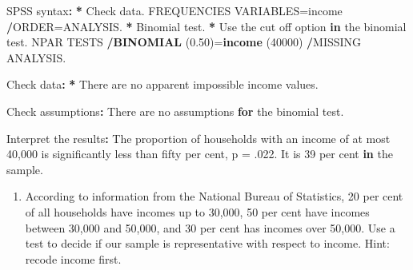 \documentclass[a4paper]{book}
\newenvironment{Shaded}{\begin{snugshade}}{\end{snugshade}}
\newcommand{\KeywordTok}[1]{\textcolor[rgb]{0,0,0}{\textbf{#1}}}
\newcommand{\DecValTok}[1]{\textcolor[rgb]{0.00,0.00,0.00}{#1}}
\newcommand{\FloatTok}[1]{\textcolor[rgb]{0.00,0.00,0.00}{#1}}
\newcommand{\StringTok}[1]{\textcolor[rgb]{0.00,0.00,0.00}{#1}}
\newcommand{\ControlFlowTok}[1]{\textcolor[rgb]{0.00,0.00,0.00}{\textbf{#1}}}
\newcommand{\OperatorTok}[1]{\textcolor[rgb]{0.00,0.00,0.00}{\textbf{#1}}}
\newcommand{\ErrorTok}[1]{\textcolor[rgb]{0.00,0.00,0.00}{\textbf{#1}}}
\newcommand{\NormalTok}[1]{#1}
\providecommand{\tightlist}{%
  \setlength{\itemsep}{0pt}\setlength{\parskip}{0pt}}
\theoremstyle{definition}
\theoremstyle{definition}
\theoremstyle{definition}
\theoremstyle{remark}
\begin{document}
\begin{Shaded}
\begin{Highlighting}[]
\NormalTok{SPSS syntax}\OperatorTok{:}\StringTok{  }
\StringTok{  }
\ErrorTok{*}\StringTok{ }\NormalTok{Check data.  }
\NormalTok{FREQUENCIES VARIABLES=income  }
  \OperatorTok{/}\NormalTok{ORDER=ANALYSIS.  }
\OperatorTok{*}\StringTok{ }\NormalTok{Binomial test.  }
\OperatorTok{*}\StringTok{ }\NormalTok{Use the cut off option }\ControlFlowTok{in}\NormalTok{ the binomial test.  }
\NormalTok{NPAR TESTS  }
  \OperatorTok{/}\KeywordTok{BINOMIAL}\NormalTok{ (}\FloatTok{0.50}\NormalTok{)=}\KeywordTok{income}\NormalTok{ (}\DecValTok{40000}\NormalTok{)  }
  \OperatorTok{/}\NormalTok{MISSING ANALYSIS.  }
  
\NormalTok{Check data}\OperatorTok{:}\StringTok{  }
\StringTok{  }
\ErrorTok{*}\StringTok{ }\NormalTok{There are no apparent impossible income values.  }
  
\NormalTok{Check assumptions}\OperatorTok{:}\StringTok{  }
\StringTok{  }
\NormalTok{There are no assumptions }\ControlFlowTok{for}\NormalTok{ the binomial test.  }
  
\NormalTok{Interpret the results}\OperatorTok{:}\StringTok{  }
\StringTok{  }
\NormalTok{The proportion of households with an income of at most }\DecValTok{40}\NormalTok{,}\DecValTok{000}   
\NormalTok{is significantly less than fifty per cent, p =}\StringTok{ }\NormalTok{.}\DecValTok{022}\NormalTok{. It is   }
\DecValTok{39}\NormalTok{ per cent }\ControlFlowTok{in}\NormalTok{ the sample.  }
\end{Highlighting}
\end{Shaded}

\begin{enumerate}
\def\labelenumi{\arabic{enumi}.}
\setcounter{enumi}{3}
\tightlist
\item
  According to information from the National Bureau of Statistics, 20
  per cent of all households have incomes up to 30,000, 50 per cent have
  incomes between 30,000 and 50,000, and 30 per cent has incomes over
  50,000. Use a test to decide if our sample is representative with
  respect to income. Hint: recode income first.
\end{enumerate}
\end{document}
